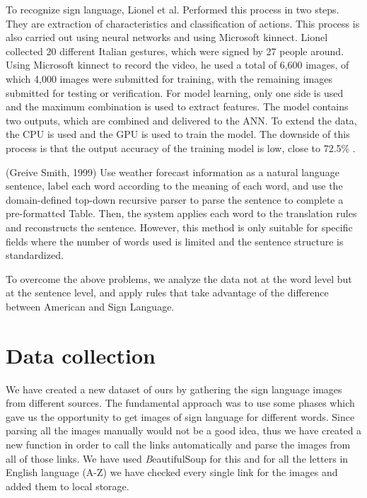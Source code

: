 \documentclass[twocolumn,10pt]{asme2ej}
\begin{document}
To recognize sign language, Lionel et al. Performed this process in two steps. They are extraction of characteristics and classification of actions. This process is also carried out using neural networks and using Microsoft kinnect. Lionel collected 20 different Italian gestures, which were signed by 27 people around. Using Microsoft kinnect to record the video, he used a total of 6,600 images, of which 4,000 images were submitted for training, with the remaining images submitted for testing or verification. For model learning, only one side is used and the maximum combination is used to extract features. The model contains two outputs, which are combined and delivered to the ANN. To extend the data, the CPU is used and the GPU is used to train the model. The downside of this process is that the output accuracy of the training model is low, close to 72.5\% \cite{signrecog}.

(Greive Smith, 1999) \cite{englishtoamerican} Use weather forecast information as a natural language sentence, label each word according to the meaning of each word, and use the domain-defined top-down recursive parser to parse the sentence to complete a pre-formatted Table. Then, the system applies each word to the translation rules and reconstructs the sentence. However, this method is only suitable for specific fields where the number of words used is limited and the sentence structure is standardized.

To overcome the above problems, we analyze the data not at the word level but at the sentence level, and apply rules that take advantage of the difference between American and Sign Language. 

\section{Data collection}

We have created a new dataset of ours by gathering the sign language images from different sources. The fundamental approach was to use some phases which gave us the opportunity to get images of sign language for different words. Since parsing all the images manually would not be a good idea, thus we have created a new function in order to call the links automatically and parse the images from all of those links. We have used {\emph BeautifulSoup} for this and for all the letters in English language (A-Z) we have checked every single link for the images and added them to local storage. 
\end{document}
